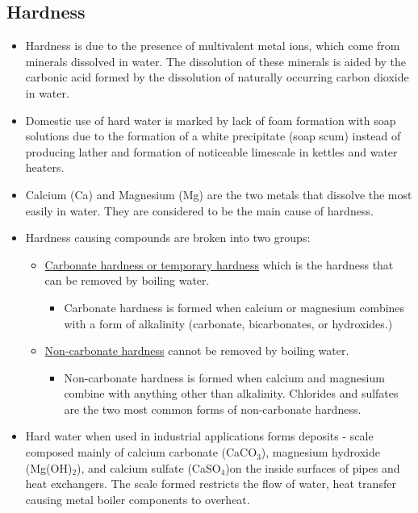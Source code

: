 \subsection{Hardness}
\begin{itemize}
\item Hardness is due to the presence of multivalent metal ions, which come from minerals dissolved in water.  The dissolution of these minerals is aided by the carbonic acid formed by the dissolution of naturally occurring carbon dioxide in water. 
\item Domestic use of hard water is marked by lack of foam formation with soap solutions due to the formation of a white precipitate (soap scum) instead of producing lather and formation of noticeable limescale in kettles and water heaters.
\item Calcium (Ca) and Magnesium (Mg)   are the two metals that dissolve the most easily in water. They are considered to be the main cause of hardness.
\item Hardness causing compounds are broken into two groups:\\
\begin{itemize}
\item \ul{Carbonate hardness or temporary hardness} which is the hardness that can be removed by boiling water.
\begin{itemize}
\item Carbonate hardness is formed when calcium or magnesium combines with a form of alkalinity (carbonate, bicarbonates, or hydroxides.) 
\end{itemize}
\item \ul{Non-carbonate hardness}  cannot be removed by boiling water.
\begin{itemize}
\item Non-carbonate hardness is formed when calcium and magnesium combine with anything other than alkalinity. Chlorides and sulfates are the two most common forms of non-carbonate hardness.
\end{itemize}
\end{itemize}
\item Hard water when used in industrial applications forms deposits - scale composed mainly of calcium carbonate (CaCO$_3$), magnesium hydroxide (Mg(OH)$_2$), and calcium sulfate (CaSO$_4$)on the inside surfaces of pipes and heat exchangers. The scale formed restricts the flow of water, heat transfer causing metal boiler components to overheat.

\end{itemize}
